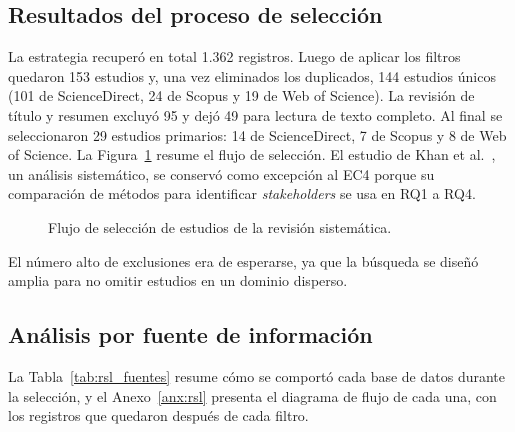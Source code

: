 \documentclass[12pt,letterpaper,oneside]{report}
\begin{document}
\subsection{Resultados del proceso de selección}
La estrategia recuperó en total 1.362 registros. Luego de aplicar los filtros
quedaron 153 estudios y, una vez eliminados los duplicados, 144 estudios únicos
(101 de ScienceDirect, 24 de Scopus y 19 de Web of Science). La revisión de
título y resumen excluyó 95 y dejó 49 para lectura de texto completo. Al final
se seleccionaron 29 estudios primarios: 14 de ScienceDirect, 7 de Scopus y 8 de
Web of Science. La Figura~\ref{fig:prisma} resume el flujo de selección. El
estudio de Khan et al.~\cite{khan2022stakeholders}, un análisis sistemático, se
conservó como excepción al EC4 porque su comparación de métodos para identificar
\textit{stakeholders} se usa en RQ1 a RQ4.

\begin{figure}[H]
\centering
{}
\caption{Flujo de selección de estudios de la revisión sistemática.}
\label{fig:prisma}
\end{figure}

El número alto de exclusiones era de esperarse, ya que la búsqueda se diseñó
amplia para no omitir estudios en un dominio disperso.

\subsection{Análisis por fuente de información}
La Tabla~\ref{tab:rsl_fuentes} resume cómo se comportó cada base de datos
durante la selección, y el Anexo~\ref{anx:rsl} presenta el diagrama de flujo de
cada una, con los registros que quedaron después de cada filtro.
\end{document}
